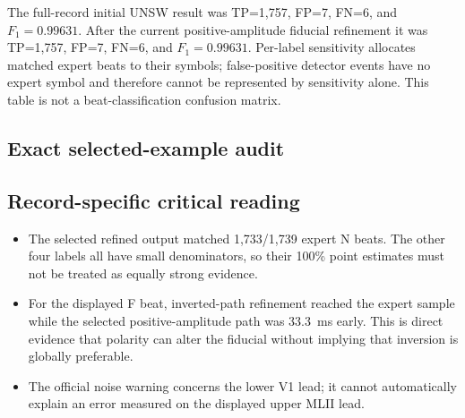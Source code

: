 \documentclass[11pt]{article}
\begin{document}
        The full-record initial UNSW result was TP=1,757, FP=7,
        FN=6, and $F_1=0.99631$. After the current positive-amplitude
        fiducial refinement it was TP=1,757, FP=7,
        FN=6, and $F_1=0.99631$. Per-label sensitivity allocates
        matched expert beats to their symbols; false-positive detector events have no expert symbol and therefore
        cannot be represented by sensitivity alone. This table is not a beat-classification confusion matrix.

        \subsection{Exact selected-example audit}
        \begin{table}[H]
        \centering
        \caption{Timing results for the deterministic displayed examples. Errors are detector minus expert.}
        \end{table}

        \subsection{Record-specific critical reading}
        \begin{itemize}
        \item The selected refined output matched 1,733/1,739 expert N beats. The other four labels all have small denominators, so their 100\% point estimates must not be treated as equally strong evidence.
\item For the displayed F beat, inverted-path refinement reached the expert sample while the selected positive-amplitude path was 33.3~ms early. This is direct evidence that polarity can alter the fiducial without implying that inversion is globally preferable.
\item The official noise warning concerns the lower V1 lead; it cannot automatically explain an error measured on the displayed upper MLII lead.
        \end{itemize}
\end{document}
